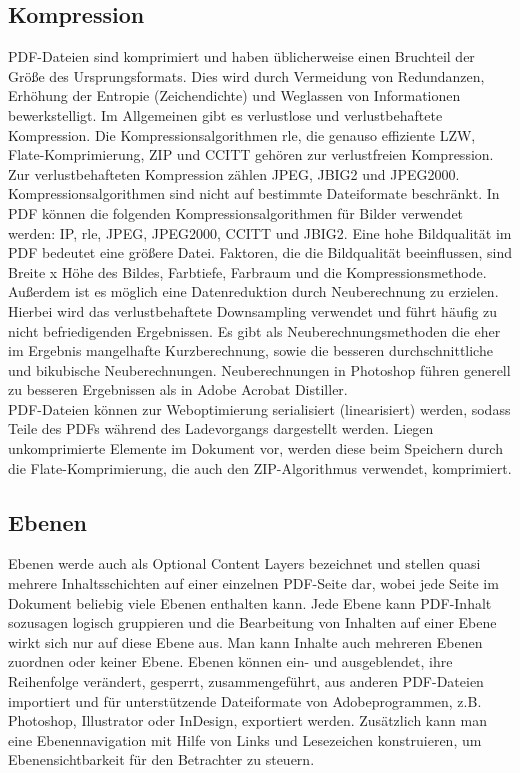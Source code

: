 \subsection{Kompression}
PDF-Dateien sind komprimiert und haben üblicherweise einen Bruchteil der Größe des Ursprungsformats. Dies wird durch Vermeidung von Redundanzen, Erhöhung der Entropie (Zeichendichte) und Weglassen von Informationen bewerkstelligt. Im Allgemeinen gibt es verlustlose und verlustbehaftete Kompression. Die Kompressionsalgorithmen \gls{rle}, die genauso effiziente LZW, Flate-Komprimierung, ZIP und CCITT gehören zur verlustfreien Kompression. Zur verlustbehafteten Kompression zählen JPEG, JBIG2 und JPEG2000. \cite{schneeberger} Kompressionsalgorithmen sind nicht auf bestimmte Dateiformate beschränkt. In PDF können die folgenden Kompressionsalgorithmen für Bilder verwendet werden: IP, \gls{rle}, JPEG, JPEG2000, CCITT und JBIG2. Eine hohe Bildqualität im PDF bedeutet eine größere Datei. Faktoren, die die Bildqualität beeinflussen, sind Breite x Höhe des Bildes, Farbtiefe, Farbraum und die Kompressionsmethode. \cite{softx} \\
Außerdem ist es möglich eine Datenreduktion durch Neuberechnung zu erzielen. Hierbei wird das verlustbehaftete Downsampling verwendet und führt häufig zu nicht befriedigenden Ergebnissen. Es gibt als Neuberechnungsmethoden die eher im Ergebnis mangelhafte Kurzberechnung, sowie die besseren durchschnittliche und bikubische Neuberechnungen. Neuberechnungen in Photoshop führen generell zu besseren Ergebnissen als in Adobe Acrobat Distiller. \cite{schneeberger} \\
PDF-Dateien können zur Weboptimierung serialisiert (linearisiert) werden, sodass Teile des PDFs während des Ladevorgangs dargestellt werden. Liegen unkomprimierte Elemente im Dokument vor, werden diese beim Speichern durch die Flate-Komprimierung, die auch den ZIP-Algorithmus verwendet, komprimiert.

\subsection{Ebenen}
Ebenen werde auch als Optional Content Layers bezeichnet und stellen quasi mehrere Inhaltsschichten auf einer einzelnen PDF-Seite dar, wobei jede Seite im Dokument beliebig viele Ebenen enthalten kann. Jede Ebene kann PDF-Inhalt sozusagen logisch gruppieren und die Bearbeitung von Inhalten auf einer Ebene wirkt sich nur auf diese Ebene aus. Man kann Inhalte auch mehreren Ebenen zuordnen oder keiner Ebene. Ebenen können ein- und ausgeblendet, ihre Reihenfolge verändert, gesperrt, zusammengeführt, aus anderen PDF-Dateien importiert und für unterstützende Dateiformate von Adobeprogrammen, z.B. Photoshop, Illustrator oder InDesign, exportiert werden. Zusätzlich kann man eine Ebenennavigation mit Hilfe von Links und Lesezeichen konstruieren, um Ebenensichtbarkeit für den Betrachter zu steuern. \cite{adobe-ebenen}

